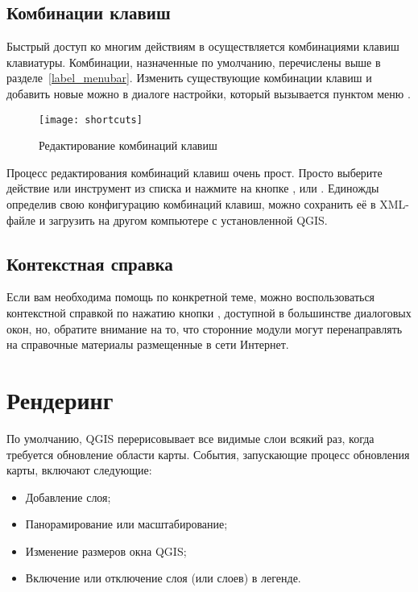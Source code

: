 \subsection{Комбинации клавиш}\label{shortcuts}

Быстрый доступ ко многим действиям в \qg осуществляется комбинациями клавиш
клавиатуры. Комбинации, назначенные по умолчанию, перечислены выше в разделе~\ref{label_menubar}.
Изменить существующие комбинации клавиш и добавить новые можно в диалоге настройки,
который вызывается пунктом меню  \arrow
{}.

\begin{figure}[ht]
   \centering
   \texttt{[image: shortcuts]}
   \caption{Редактирование комбинаций клавиш \wincaption} \label{fig:shortcuts}
\end{figure}

Процесс редактирования комбинаций клавиш очень прост. Просто выберите
действие или инструмент из списка и нажмите на кнопке ,
 или . Единожды определив свою
конфигурацию комбинаций клавиш, можно сохранить её в XML-файле и загрузить
на другом компьютере с установленной QGIS.

\subsection{Контекстная справка}\label{context_help}

Если вам необходима помощь по конкретной теме, можно воспользоваться
контекстной справкой по нажатию кнопки , доступной в
большинстве диалоговых окон, но, обратите внимание на то, что сторонние
модули могут перенаправлять на справочные материалы размещенные в сети
Интернет.

\section{Рендеринг}\label{subsec:redraw_events}

По умолчанию, QGIS перерисовывает все видимые слои всякий раз, когда
требуется обновление области карты. События, запускающие
процесс обновления карты, включают следующие:

\begin{itemize}
\item Добавление слоя;
\item Панорамирование или масштабирование;
\item Изменение размеров окна QGIS;
\item Включение или отключение слоя (или слоев) в легенде.
\end{itemize}


